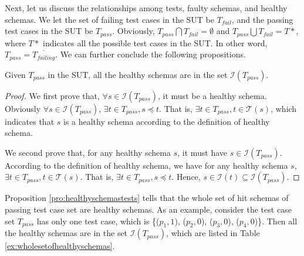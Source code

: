 Next, let us discuss the relationships among tests, faulty schemas, and healthy schemas. We let the set of failing test cases in the SUT be $T_{fail}$, and the passing test cases in the SUT be $T_{pass}$. Obviously, $T_{pass} \bigcap T_{fail} = \emptyset$ and $T_{pass} \bigcup T_{fail} = T*$, where $T*$ indicates all the possible test cases in the SUT. In other word, $T_{pass} = \overline{T_{failing}}$. We can further conclude the following propositions.

\begin{proposition}\label{pro:healthyschemastests}
Given  $T_{pass}$ in the SUT, all the healthy schemas are in the set $\mathcal{I}(T_{pass})$.
\end{proposition}

\begin{proof}
We first prove that, $\forall s \in \mathcal{I}(T_{pass})$, it must be a healthy schema.
Obviously $\forall s \in \mathcal{I}(T_{pass})$, $\exists t \in T_{pass}, s \preceq t$. That is, $\exists t \in T_{pass},  t \in \mathcal{T}(s)$,  which indicates that $s$ is a healthy schema according to the definition of healthy schema.

We second prove that, for any healthy schema $s$, it must have $s \in \mathcal{I}(T_{pass})$.
According to the definition of healthy schema, we have for any healthy schema $s$,  $\exists t \in T_{pass},  t \in \mathcal{T}(s)$. That is,  $\exists t \in T_{pass}, s \preceq t$. Hence, $s \in \mathcal{I}(t) \subseteq  \mathcal{I}(T_{pass})$.
\end{proof}

Proposition \ref{pro:healthyschemastests} tells that the whole set of hit schemas of passing test case set are healthy schemas.  As an example, consider the test case set $T_{pass}$ has only one test case, which is \{($p_{1}, 1$), ($p_{2}, 0$), ($p_{3}, 0$), ($p_{4}, 0$)\}. Then all the healthy schemas are in the set $\mathcal{I}(T_{pass})$, which are listed in Table \ref{ex:wholesetofhealthyschemas}.

